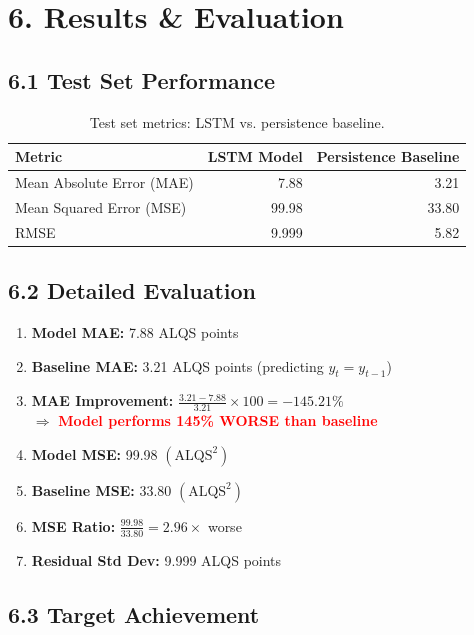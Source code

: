 \documentclass[11pt,a4paper]{article}
\begin{document}
\section{6. Results \& Evaluation}

\subsection{6.1 Test Set Performance}

\begin{table}[h]
\centering
\begin{tabular}{lrr}
\toprule
\textbf{Metric} & \textbf{LSTM Model} & \textbf{Persistence Baseline} \\
\midrule
Mean Absolute Error (MAE) & 7.88 & 3.21 \\
Mean Squared Error (MSE) & 99.98 & 33.80 \\
RMSE & 9.999 & 5.82 \\
\bottomrule
\end{tabular}
\caption{Test set metrics: LSTM vs. persistence baseline.}
\end{table}

\subsection{6.2 Detailed Evaluation}

\begin{enumerate}
    \item \textbf{Model MAE:} 7.88 ALQS points
    \item \textbf{Baseline MAE:} 3.21 ALQS points (predicting $y_t = y_{t-1}$)
    \item \textbf{MAE Improvement:} $\frac{3.21 - 7.88}{3.21} \times 100 = -145.21\%$ \\
    \quad $\Rightarrow$ \textcolor{red}{\textbf{Model performs 145\% WORSE than baseline}}
    \item \textbf{Model MSE:} 99.98 $(\text{ALQS}^2)$
    \item \textbf{Baseline MSE:} 33.80 $(\text{ALQS}^2)$
    \item \textbf{MSE Ratio:} $\frac{99.98}{33.80} = 2.96\times$ worse
    \item \textbf{Residual Std Dev:} 9.999 ALQS points
\end{enumerate}

\subsection{6.3 Target Achievement}
\end{document}
